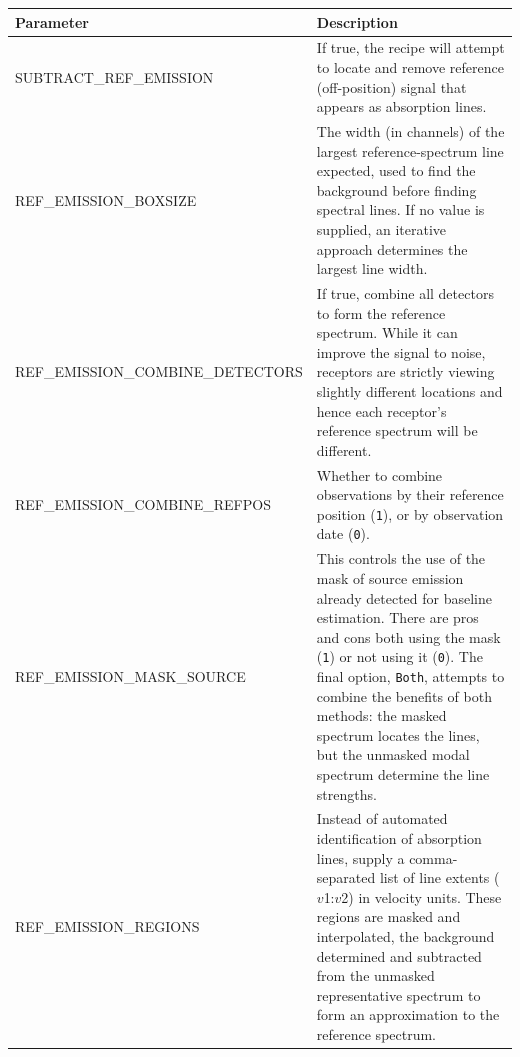 \documentclass[11pt,oneside,chapters]{starlink}
\begin{document}
\begin{table}[h!]
\begin{small}
\begin{tabular}{|p{6.8cm}|p{8.6cm}|}
\hline
\textbf{Parameter} & \textbf{Description} \\
\hline

SUBTRACT\_REF\_EMISSION & If true, the recipe will attempt to locate and
                           remove reference (off-position) signal that
                           appears as absorption lines. \\

REF\_EMISSION\_BOXSIZE & The width (in channels) of the largest reference-spectrum line
                         expected, used to find the background before finding spectral
                         lines.  If no value is supplied, an iterative approach determines
                         the largest line width. \smallskip  \\

REF\_EMISSION\_COMBINE\_DETECTORS & If true, combine all detectors to form the
                                    reference spectrum.  While it can improve the
                                    signal to noise, receptors are strictly viewing
                                    slightly different locations and hence each
                                    receptor's reference spectrum will be different.  \\

REF\_EMISSION\_COMBINE\_REFPOS & Whether to combine observations by their
                                 reference position (\texttt{1}), or by observation date
                                 (\texttt{0}). \\

REF\_EMISSION\_MASK\_SOURCE & This controls the use of the mask of source emission
                              already detected for baseline estimation.  There are pros
                              and cons both using the mask (\texttt{1}) or not using it (\texttt{0}).
                              The final option, \texttt{Both}, attempts to combine the benefits of
                              both methods: the masked spectrum locates the lines, but the unmasked
                              modal spectrum determine the line strengths. \\

REF\_EMISSION\_REGIONS & Instead of automated identification of absorption lines, supply
                         a comma-separated list of line extents ($v$1:$v$2) in velocity units.
                         These regions are masked and interpolated, the background determined and
                         subtracted from the unmasked representative spectrum to form an
                         approximation to the reference spectrum. \\


\end{tabular}
\end{small}
\end{table}
\end{document}
